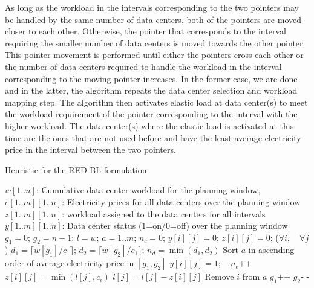 As long as the workload in the intervals corresponding to the two pointers may be handled by the same number of data centers, both of the pointers are moved closer to each other. Otherwise, the pointer that corresponds to the interval requiring the smaller number of data centers is moved towards the other pointer. This pointer movement is performed until either the pointers cross each other or the number of data centers required to handle the workload in the interval corresponding to the moving pointer increases. In the former case, we are done and in the latter, the algorithm repeats the data center selection and workload mapping step. The algorithm then activates elastic load at data center(s) to meet the workload requirement of the pointer corresponding to the interval with the higher workload. The data center(s) where the elastic load is activated at this time are the ones that are not used before and have the least average electricity price in the interval between the two pointers.

\begin{algorithm}
\caption{Heuristic for the RED-BL formulation}
\label{algo:heur1}
\begin{algorithmic}[1]
\REQUIRE $w[1..n]$: Cumulative data center workload for the planning window,\\$e[1..m][1..n]$: Electricity prices for all data centers over the planning window
\ENSURE $z[1..m][1..n]$: workload assigned to the data centers for all intervals\\
$y[1..m][1..n]$: Data center status (1=on/0=off) over the planning window
\STATE $g_1 = 0$; \quad $g_2 = n-1$; \quad $l = w$; \quad $a = 1..m$; \quad $n_c = 0$;
\STATE \quad $y[i][j]=0$; \quad $z[i][j]=0$; \quad ($\forall i, \quad \forall j$)
\REPEAT
	\STATE $d_1 = \lceil w[g_1]/c_1 \rceil$; \quad $d_2 = \lceil w[g_2]/c_1 \rceil$; \quad $n_d = \min(d_1, d_2)$
		\STATE Sort $a$ in ascending order of average electricity price in $[g_1, g_2]$
				\STATE $y[i][j] = 1; \quad n_c$++
				\STATE $z[i][j]=\min(l[j], c_i)$
				\STATE $l[j] = l[j] - z[i][j]$				
				\STATE Remove $i$ from $a$
			\ENDFOR
		\ENDFOR
	\ENDIF
		\REPEAT
			\STATE $g_1$++
		\REPEAT
			\STATE $g_2$- -
\end{algorithmic}
\end{algorithm}


